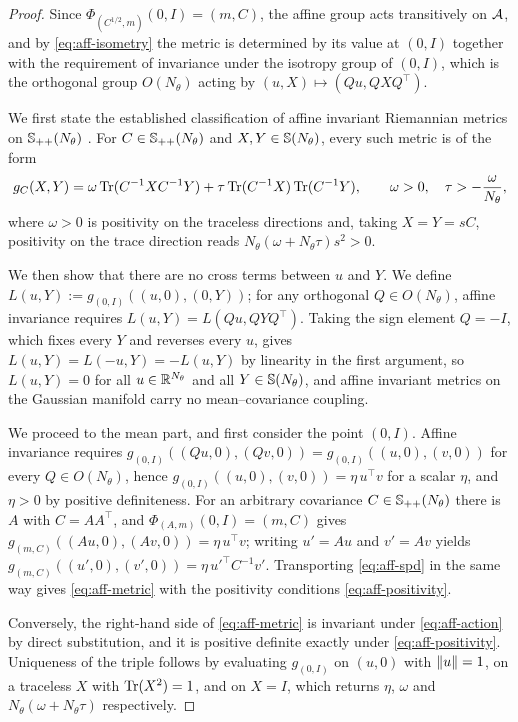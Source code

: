 \begin{proof}
    Since $\Phi_{(C^{1/2}, m)} (0, I) = (m, C)$, the affine group acts transitively on $\mathcal{A}$, and by \eqref{eq:aff-isometry} the metric is determined by its value at $(0, I)$ together with the requirement of invariance under the isotropy group of $(0,I)$, which is the orthogonal group $O(N_\theta)$ acting by $(u, X) \mapsto (Qu, QXQ^\top)$.

    We first state the established classification of affine invariant Riemannian metrics on $\mathbb{S}_{++}(N_\theta)$ \cite{thanwerdas2019affine, thanwerdas2023n}. For $C \in \mathbb{S}_{++}(N_\theta)$ and $X, Y \in \mathbb{S}(N_\theta)$, every such metric is of the form
    \begin{equation}\label{eq:aff-spd}
        g_C (X, Y) = \omega \operatorname{Tr} (C^{-1} X C^{-1} Y) + \tau \operatorname{Tr} (C^{-1} X) \operatorname{Tr} (C^{-1} Y), \qquad \omega > 0, \quad \tau > -\frac{\omega}{N_\theta},
    \end{equation}
    where $\omega > 0$ is positivity on the traceless directions and, taking $X = Y = sC$, positivity on the trace direction reads $N_\theta (\omega + N_\theta \tau) s^2 > 0$.

    We then show that there are no cross terms between $u$ and $Y$. We define $L(u, Y) := g_{(0,I)}((u, 0), (0, Y))$; for any orthogonal $Q \in O(N_\theta)$, affine invariance requires $L(u, Y) = L(Qu, QYQ^\top)$. Taking the sign element $Q = -I$, which fixes every $Y$ and reverses every $u$, gives $L(u, Y) = L(-u, Y) = -L(u, Y)$ by linearity in the first argument, so $L(u, Y) = 0$ for all $u \in \mathbb{R}^{N_\theta}$ and all $Y \in \mathbb{S}(N_\theta)$, and affine invariant metrics on the Gaussian manifold carry no mean--covariance coupling.

    We proceed to the mean part, and first consider the point $(0, I)$. Affine invariance requires $g_{(0, I)} ((Qu, 0), (Qv, 0)) = g_{(0, I)} ((u, 0), (v, 0))$ for every $Q \in O(N_\theta)$, hence $g_{(0, I)} ((u, 0), (v, 0)) = \eta \, u^\top v$ for a scalar $\eta$, and $\eta > 0$ by positive definiteness. For an arbitrary covariance $C \in \mathbb{S}_{++}(N_\theta)$ there is $A$ with $C = AA^\top$, and $\Phi_{(A, m)} (0, I) = (m, C)$ gives $g_{(m, C)} ((Au, 0), (Av, 0)) = \eta \, u^\top v$; writing $u' = Au$ and $v' = Av$ yields $g_{(m, C)}((u',0),(v',0)) = \eta \, u'^\top C^{-1} v'$. Transporting \eqref{eq:aff-spd} in the same way gives \eqref{eq:aff-metric} with the positivity conditions \eqref{eq:aff-positivity}.

    Conversely, the right-hand side of \eqref{eq:aff-metric} is invariant under \eqref{eq:aff-action} by direct substitution, and it is positive definite exactly under \eqref{eq:aff-positivity}. Uniqueness of the triple follows by evaluating $g_{(0,I)}$ on $(u,0)$ with $\left\lVert u\right\rVert = 1$, on a traceless $X$ with $\operatorname{Tr}(X^2) = 1$, and on $X = I$, which returns $\eta$, $\omega$ and $N_\theta(\omega + N_\theta\tau)$ respectively.
\end{proof}

